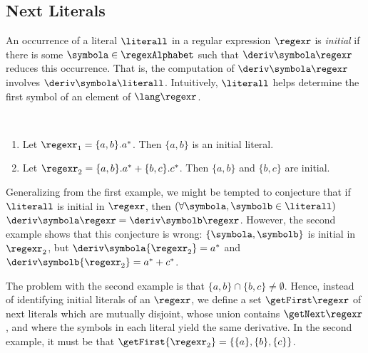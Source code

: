 \subsection{Next Literals}
\label{sec:next}

An occurrence of a literal $\literall$ in a regular expression $\regexr$ is \emph{initial} if there is
some $\symbola\in\regexAlphabet$ such that $\deriv\symbola\regexr$ reduces this occurrence. That is,
the computation of $\deriv\symbola\regexr$ involves $\deriv\symbola\literall$. Intuitively,
$\literall$ helps determine the first symbol of an element of $\lang\regexr$.
\begin{example}\label{example:next-literals} ~\\[-\baselineskip]
  \begin{enumerate}
    \item 
      Let $\regexr_1 = \{a,b\}.a^*$. Then $ \{a,b\}$ is an initial literal.
    \item 
      Let $\regexr_2 = \{a,b\}.a^* + \{b,c\}.c^*$. Then $ \{a,b\}$ and $\{b, c\}$ are initial.
  \end{enumerate}
\end{example}

\noindent
Generalizing from the first example, we might be tempted to conjecture that if $\literall$ is initial
in $\regexr$,
then $(\forall \symbola, \symbolb\in\literall)$ $\deriv\symbola\regexr =
\deriv\symbolb\regexr$. However, the second example shows that this conjecture is wrong:
$\{\symbola, \symbolb\}$ is initial in $\regexr_2$, but $\deriv\symbola{\regexr_2} = a^*$ and
$\deriv\symbolb{\regexr_2} = a^* + c^*$.

The problem with the second example is that $\{a,b\} \cap \{b,c\} \ne \emptyset$. Hence, instead of
identifying initial literals of an {\ERE} $\regexr$, we define a set $\getFirst\regexr$ of next
literals which are mutually disjoint, whose union contains $\getNext\regexr$, and where the symbols in
each literal yield the same derivative. In the second example, it must be that $\getFirst{\regexr_2}
= \{ \{a\}, \{b\}, \{c\} \}$.

